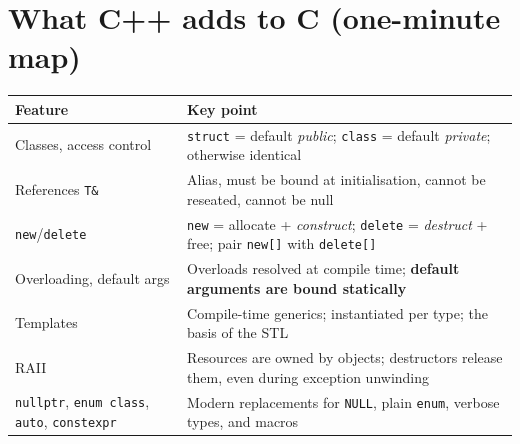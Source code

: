 \documentclass[10pt,a4paper,openany,oneside]{report}
\newcommand{\prio}[1]{\texorpdfstring{\ifcase#1\or{\color{gold}\ding{72}}\or{\color{gold}\ding{72}\ding{72}}\or{\color{gold}\ding{72}\ding{72}\ding{72}}\fi}{}}
\begin{document}
\section{What C++ adds to C (one-minute map) \prio{2}}
\begin{center}\small
\begin{xltabular}{\textwidth}{@{}L{3.6cm}Y@{}}
\toprule
\textbf{Feature} & \textbf{Key point}\\
\midrule\endhead
Classes, access control & \texttt{struct} = default \emph{public}; \texttt{class} = default \emph{private}; otherwise identical\\
References \texttt{T\&} & Alias, must be bound at initialisation, cannot be reseated, cannot be null\\
\texttt{new}/\texttt{delete} & \texttt{new} = allocate + \emph{construct}; \texttt{delete} = \emph{destruct} + free; pair \texttt{new[]} with \texttt{delete[]}\\
Overloading, default args & Overloads resolved at compile time; \textbf{default arguments are bound statically}\\
Templates & Compile-time generics; instantiated per type; the basis of the STL\\
RAII & Resources are owned by objects; destructors release them, even during exception unwinding\\
\texttt{nullptr}, \texttt{enum class}, \texttt{auto}, \texttt{constexpr} & Modern replacements for \texttt{NULL}, plain \texttt{enum}, verbose types, and macros\\
\bottomrule
\end{xltabular}
\end{center}
\end{document}
